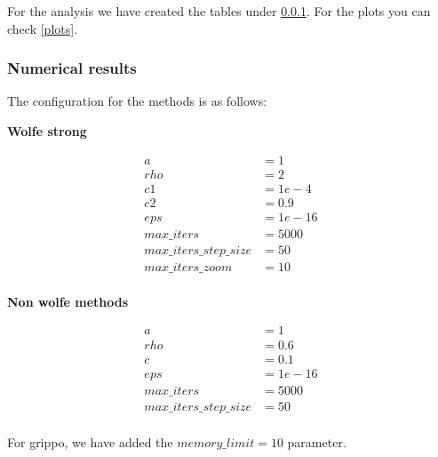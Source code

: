 \documentclass[a4paper,11pt]{article}
\numberwithin{equation}{section} %
\begin{document}
For the analysis we have created the tables under \ref{simulation1}. For the plots you can check \ref{plots}.


\subsubsection{Numerical results}
\label{simulation1}



The configuration for the methods is as follows:

\textbf{Wolfe strong}

\begin{align*}
a &= 1 \\
rho &= 2 \\
c1 &= 1e-4 \\
c2 &= 0.9 \\
eps &= 1e-16 \\ 
max\_iters &= 5000 \\ 
max\_iters\_step\_size &= 50 \\
max\_iters\_zoom &= 10 \\
\end{align*}

\textbf{Non wolfe methods}

\begin{align*}
a &= 1 \\
rho &= 0.6 \\
c &= 0.1 \\
eps &= 1e-16 \\ 
max\_iters &= 5000 \\ 
max\_iters\_step\_size &= 50 \\
\end{align*}

For grippo, we have added the $memory\_limit = 10$ parameter.
\end{document}
